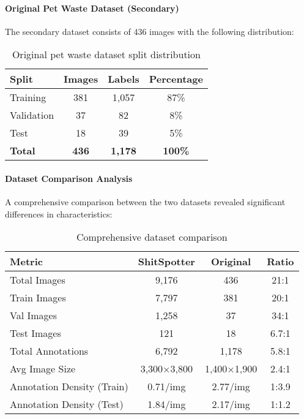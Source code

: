 \documentclass[12pt,a4paper]{article}
\begin{document}
\paragraph{Original Pet Waste Dataset (Secondary)}
The secondary dataset consists of 436 images with the following distribution:
\begin{table}[H]
\centering
\begin{tabular}{lccc}
\toprule
\textbf{Split} & \textbf{Images} & \textbf{Labels} & \textbf{Percentage} \\
\midrule
Training & 381 & 1,057 & 87\% \\
Validation & 37 & 82 & 8\% \\
Test & 18 & 39 & 5\% \\
\midrule
\textbf{Total} & \textbf{436} & \textbf{1,178} & \textbf{100\%} \\
\bottomrule
\end{tabular}
\caption{Original pet waste dataset split distribution}
\label{tab:original_dataset_stats}
\end{table}

\paragraph{Dataset Comparison Analysis}
A comprehensive comparison between the two datasets revealed significant differences in characteristics:
\begin{table}[H]
\centering
\begin{tabular}{lccc}
\toprule
\textbf{Metric} & \textbf{ShitSpotter} & \textbf{Original} & \textbf{Ratio} \\
\midrule
Total Images & 9,176 & 436 & 21:1 \\
Train Images & 7,797 & 381 & 20:1 \\
Val Images & 1,258 & 37 & 34:1 \\
Test Images & 121 & 18 & 6.7:1 \\
Total Annotations & 6,792 & 1,178 & 5.8:1 \\
Avg Image Size & 3,300×3,800 & 1,400×1,900 & 2.4:1 \\
Annotation Density (Train) & 0.71/img & 2.77/img & 1:3.9 \\
Annotation Density (Test) & 1.84/img & 2.17/img & 1:1.2 \\
\bottomrule
\end{tabular}
\caption{Comprehensive dataset comparison}
\label{tab:dataset_comparison}
\end{table}
\end{document}
